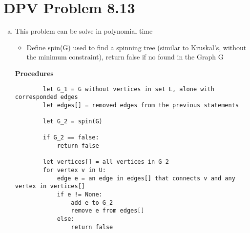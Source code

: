 \documentclass{article}
\begin{document}
\section{DPV Problem 8.13}
\begin{enumerate}[a)]
    \item This problem can be solve in polynomial time \\
    \begin{itemize}
        \item Define spin(G) used to find a spinning tree (similar to Kruskal’s, without the minimum constraint), return false if no found in the Graph G
    \end{itemize}
    \textbf{Procedures}
    \begin{verbatim}
        let G_1 = G without vertices in set L, alone with corresponded edges
        let edges[] = removed edges from the previous statements

        let G_2 = spin(G)

        if G_2 == false:
            return false
        
        let vertices[] = all vertices in G_2
        for vertex v in U:
            edge e = an edge in edges[] that connects v and any vertex in vertices[] 
            if e != None:
                add e to G_2
                remove e from edges[]
            else:
                return false
        

\end{verbatim}
\end{enumerate}
\end{document}
